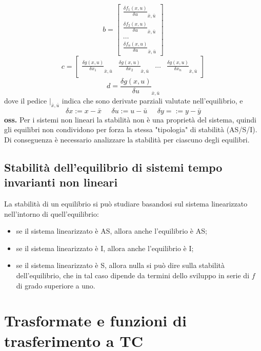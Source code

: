     \[
        b = \left[\begin{matrix}
            \frac{\delta f_1 (x,u)}{\delta u}_{\bar{x}, \bar{u}}\\
            \frac{\delta f_2 (x,u)}{\delta u}_{\bar{x}, \bar{u}}\\
            \dots\\
            \frac{\delta f_n (x,u)}{\delta u}_{\bar{x}, \bar{u}}
        \end{matrix}\right]
    \]
    \[
        c = \left[\begin{matrix}
            \frac{\delta g(x,u)}{\delta x_1}_{\bar{x}, \bar{u}} &
            \frac{\delta g (x,u)}{\delta x_2}_{\bar{x}, \bar{u}} & 
            \dots &
            \frac{\delta g (x,u)}{\delta x_n}_{\bar{x}, \bar{u}}
        \end{matrix}\right]
    \]
    \[
        d = \frac{\delta g (x,u)}{\delta u}_{\bar{x}, \bar{u}}
    \]
    dove il pedice $|_{\bar{x}, \bar{u}}$ indica che sono derivate parziali valutate nell'equilibrio, e
    \[
        \delta x := x-\bar{x} \;\;\;\;\;\delta u := u- \bar{u} \;\;\;\;\; \delta y = := y- \bar{y}
    \]
    \textbf{oss.} Per i sistemi non lineari la stabilità non è una proprietà del sistema, quindi gli equilibri non condividono per forza la stessa "tipologia" di stabilità (AS/S/I). Di conseguenza è necessario analizzare la stabilità per ciascuno degli equilibri.
    \subsection{Stabilità dell'equilibrio di sistemi tempo invarianti non lineari}
    La stabilità di un equilibrio si può studiare basandosi sul sistema linearizzato nell'intorno di quell'equilibrio:
    \begin{itemize}
        \item se il sistema linearizzato è AS, allora anche l'equilibrio è AS;
        \item se il sistema linearizzato è I, allora anche l'equilibrio è I;
        \item se il sistema linearizzato è S, allora nulla si può dire sulla stabilità dell'equilibrio, che in tal caso dipende da termini dello sviluppo in serie di $f$ di grado superiore a uno.
    \end{itemize}
    \newpage\section{Trasformate e funzioni di trasferimento a TC}
